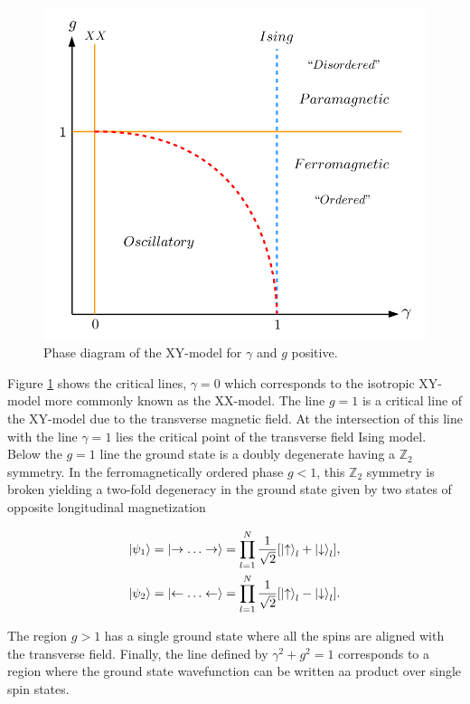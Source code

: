 \begin{figure}[htb]
	\centering
	\includegraphics[scale=0.45]{figures/XYPhase.png}
	\caption{Phase diagram of the XY-model for $\gamma$ and $g$ positive.}
	\label{fig:PhaseDiagram}
\end{figure}

Figure \ref{fig:PhaseDiagram} shows the critical lines, $\gamma=0$ which corresponds to the isotropic XY-model more commonly known as the XX-model. The line $g=1$ is a critical line of the XY-model due to the transverse magnetic field. At the intersection of this line with the line $\gamma=1$ lies the critical point of the transverse field Ising model. Below the $g=1$ line the ground state is a doubly degenerate having a $\mathbb{Z}_2$ symmetry. In the ferromagnetically ordered phase $g<1$, this  $\mathbb{Z}_2$ symmetry is broken yielding a two-fold degeneracy in the ground state given by two states of opposite longitudinal magnetization

\begin{align}
	\ket{\psi_1} &= \ket{\rightarrow\ldots\rightarrow}=\prod_{l=1}^{N}\frac{1}{\sqrt{2}}\qty[\ket\uparrow _l + \ket\downarrow_l],\nonumber\\ 
	\ket{\psi_2} &= \ket{\leftarrow\ldots\leftarrow}= \prod_{l=1}^{N}\frac{1}{\sqrt{2}}\qty[\ket\uparrow _l - \ket\downarrow_l] .
\end{align}


The region $g>1$ has a single ground state where all the spins are aligned with the transverse field. Finally, the line defined by $\gamma^2 + g^2 = 1$ corresponds to a region where the ground state wavefunction can be written aa product over single spin states.


